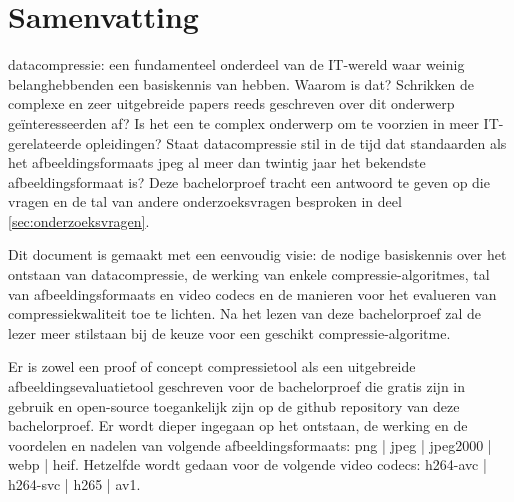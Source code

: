 
%
%


\chapter*{Samenvatting}
\label{ch:samenvatting}

\Gls{datacompressie}: een fundamenteel onderdeel van de IT-wereld waar weinig belanghebbenden een basiskennis van hebben. Waarom is dat? Schrikken de complexe en zeer uitgebreide papers reeds geschreven over dit onderwerp geïnteresseerden af? Is het een te complex onderwerp om te voorzien in meer IT-gerelateerde opleidingen? Staat \gls{datacompressie} stil in de tijd dat standaarden als het \glspl{afbeeldingsformaat} \gls{jpeg} al meer dan twintig jaar het bekendste \gls{afbeeldingsformaat} is? Deze bachelorproef tracht een antwoord te geven op die vragen en de tal van andere onderzoeksvragen besproken in deel \ref{sec:onderzoeksvragen}. 

Dit document is gemaakt met een eenvoudig visie: de nodige basiskennis over het ontstaan van \gls{datacompressie}, de werking van enkele \glspl{compressie-algoritme}, tal van \glspl{afbeeldingsformaat} en video \glspl{codec} en de manieren voor het evalueren van compressiekwaliteit toe te lichten. Na het lezen van deze bachelorproef zal de lezer meer stilstaan bij de keuze voor een geschikt \gls{compressie-algoritme}.

Er is zowel een proof of concept \gls{compressietool} als een uitgebreide \gls{afbeeldingsevaluatietool} geschreven voor de bachelorproef die gratis zijn in gebruik en \gls{open-source} toegankelijk zijn op de \gls{github} repository van deze bachelorproef. Er wordt dieper ingegaan op het ontstaan, de werking en de voordelen en nadelen van volgende \glspl{afbeeldingsformaat}: \gls{png} | \gls{jpeg} | \gls{jpeg2000} | \gls{webp} | \gls{heif}. Hetzelfde wordt gedaan voor de volgende video \glspl{codec}: \gls{h264-avc} | \gls{h264-svc} | \gls{h265} | \gls{av1}.

